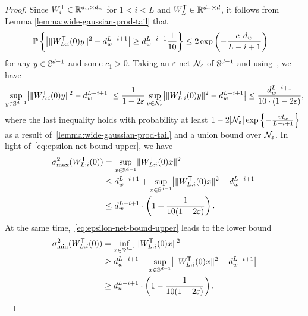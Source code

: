\begin{proof}
	Since $W_{i}^{\T} \in \Rbb^{d_w \times d_w}$ for $1< i < L$ and $W_{L}^{\T} \in \Rbb^{d_w \times d}$, it follows from Lemma \ref{lemma:wide-gaussian-prod-tail} that
	\begin{align*}
		 & \prob{\abs*{\norm{W_{L:i}^{\T}(0) y}^2 - d_w^{L-i+1}} \geq d_w^{L-i+1}\frac{1}{10}}
		\leq
		2\exp\left(-\frac{c_1 d_w}{L - i + 1}\right)
	\end{align*}
	for any $y \in \Sbb^{d-1}$ and some $c_1 > 0$. Taking an $\varepsilon$-net $\cN_{\varepsilon}$ of
	$\Sbb^{d-1}$ and using~\citep[Exercise 4.3.4]{Ver18}, we have
	\begin{equation}
		\sup_{y \in \Sbb^{d-1}} \abs*{\norm{W_{L:i}^{\T}(0) y}^2 - d_w^{L-i+1}} \leq
		\frac{1}{1 - 2 \varepsilon} \sup_{y \in \cN_{\varepsilon}} \abs*{\norm{W_{L:i}^{\T}(0)y}^2 - d_w^{L-i+1}} \leq
		\frac{d_w^{L-i+1}}{10  \cdot (1 - 2 \varepsilon)}, \label{eq:epsilon-net-bound-upper}
	\end{equation}
	where the last inequality holds with probability at least $1 - 2 \abs{\cN_{\varepsilon}} \exp\left\{-\frac{c d_w}{L - i + 1}\right\}$
	as a result of~\cref{lemma:wide-gaussian-prod-tail} and a union bound over $\cN_{\varepsilon}$.
	In light of~\cref{eq:epsilon-net-bound-upper}, we have
	\begin{align}
		\sigma_{\max}^2(W_{L:i}^{\T}(0)) & = \sup_{x \in \Sbb^{d-1}}
		\norm{W_{L:i}^{\T}(0) x}^2 \notag                                                                                                    \\
		                                 & \leq d_w^{L-i+1} + \sup_{x \in \Sbb^{d-1}} \abs*{\norm{W_{L:i}^{\T}(0) x}^2 - d_w^{L-i+1}} \notag \\
		                                 & \leq d_w^{L-i+1} \cdot \left(1 + \frac{1}{10(1 - 2 \varepsilon)}\right). \label{eq:wLi-ub-epsnet}
	\end{align}
	At the same time,~\cref{eq:epsilon-net-bound-upper} leads to the lower bound
	\begin{align}
		\sigma_{\min}^2(W_{L:i}^{\T}(0)) & = \inf_{x \in \Sbb^{d-1}}
		\norm{W_{L:i}^{\T}(0) x}^2 \notag                                                                                                      \\
		                                 & \geq d_w^{L-i+1} - \sup_{x \in \Sbb^{d-1}} \abs*{\norm{W_{L:i}^{\T}(0) x}^2 - d_w^{L-i+1}} \notag   \\
		                                 & \geq d_w^{L-i+1} \cdot \left( 1 - \frac{1}{10(1 - 2 \varepsilon)} \right). \label{eq:wLi-lb-epsnet}

\end{align}
\end{proof}
